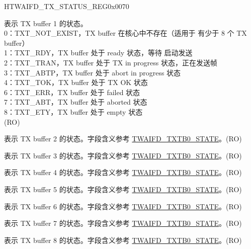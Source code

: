 \begin{register}{H}{TWAIFD\_TX\_STATUS\_REG}{0x0070}\label{regdesc:TWAIFDTXSTATUSREG}
%
%
%
%
%
%
%
%
\regnewline%
\begin{regdesc}\begin{reglist}
\label{fielddesc:TWAIFDTXTB0STATE}\item [TWAIFD\_TXTB0\_STATE] 表示 TX buffer 1 的状态。\\
0：TXT\_NOT\_EXIST，TX buffer 在核心中不存在（适用于 \modulename 有少于 8 个 TX buffer）\\
1：TXT\_RDY，TX buffer 处于 ready 状态，等待 \modulename 启动发送\\
2：TXT\_TRAN，TX buffer 处于 TX in progress 状态，\modulename 正在发送帧\\
3：TXT\_ABTP，TX buffer 处于 abort in progress 状态\\
4：TXT\_TOK，TX buffer 处于 TX OK 状态\\
6：TXT\_ERR，TX buffer 处于 failed 状态\\
7：TXT\_ABT，TX buffer 处于 aborted 状态\\
8：TXT\_ETY，TX buffer 处于 empty 状态\\(RO)
\label{fielddesc:TWAIFDTX2S}\item [TWAIFD\_TX2S] 表示 TX buffer 2 的状态。字段含义参考 \hyperref[fielddesc:TWAIFDTXTB0STATE]{TWAIFD\_TXTB0\_STATE}。(RO)
\label{fielddesc:TWAIFDTX3S}\item [TWAIFD\_TX3S] 表示 TX buffer 3 的状态。字段含义参考 \hyperref[fielddesc:TWAIFDTXTB0STATE]{TWAIFD\_TXTB0\_STATE}。(RO)
\label{fielddesc:TWAIFDTX4S}\item [TWAIFD\_TX4S] 表示 TX buffer 4 的状态。字段含义参考 \hyperref[fielddesc:TWAIFDTXTB0STATE]{TWAIFD\_TXTB0\_STATE}。(RO)
\label{fielddesc:TWAIFDTX5S}\item [TWAIFD\_TX5S] 表示 TX buffer 5 的状态。字段含义参考 \hyperref[fielddesc:TWAIFDTXTB0STATE]{TWAIFD\_TXTB0\_STATE}。(RO)
\label{fielddesc:TWAIFDTX6S}\item [TWAIFD\_TX6S] 表示 TX buffer 6 的状态。字段含义参考 \hyperref[fielddesc:TWAIFDTXTB0STATE]{TWAIFD\_TXTB0\_STATE}。(RO)
\label{fielddesc:TWAIFDTX7S}\item [TWAIFD\_TX7S] 表示 TX buffer 7 的状态。字段含义参考 \hyperref[fielddesc:TWAIFDTXTB0STATE]{TWAIFD\_TXTB0\_STATE}。(RO)
\label{fielddesc:TWAIFDTX8S}\item [TWAIFD\_TX8S] 表示 TX buffer 8 的状态。字段含义参考 \hyperref[fielddesc:TWAIFDTXTB0STATE]{TWAIFD\_TXTB0\_STATE}。(RO)
\end{reglist}\end{regdesc}
\end{register}


